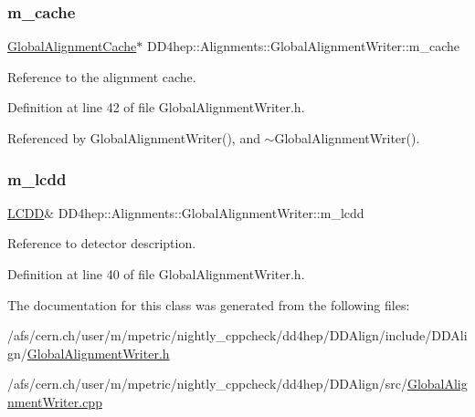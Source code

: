 \subsubsection{\texorpdfstring{m\+\_\+cache}{m\_cache}}
{\footnotesize\ttfamily \hyperlink{class_d_d4hep_1_1_alignments_1_1_global_alignment_cache}{Global\+Alignment\+Cache}$\ast$ D\+D4hep\+::\+Alignments\+::\+Global\+Alignment\+Writer\+::m\+\_\+cache\hspace{0.3cm}{\ttfamily [protected]}}



Reference to the alignment cache. 



Definition at line 42 of file Global\+Alignment\+Writer.\+h.



Referenced by Global\+Alignment\+Writer(), and $\sim$\+Global\+Alignment\+Writer().

\hypertarget{class_d_d4hep_1_1_alignments_1_1_global_alignment_writer_a831748e7145b8b3b95da4e0b87a49f5f}{}\label{class_d_d4hep_1_1_alignments_1_1_global_alignment_writer_a831748e7145b8b3b95da4e0b87a49f5f} 
\subsubsection{\texorpdfstring{m\+\_\+lcdd}{m\_lcdd}}
{\footnotesize\ttfamily \hyperlink{class_d_d4hep_1_1_geometry_1_1_l_c_d_d}{L\+C\+DD}\& D\+D4hep\+::\+Alignments\+::\+Global\+Alignment\+Writer\+::m\+\_\+lcdd\hspace{0.3cm}{\ttfamily [protected]}}



Reference to detector description. 



Definition at line 40 of file Global\+Alignment\+Writer.\+h.



The documentation for this class was generated from the following files\+:\begin{DoxyCompactItemize}
\item 
/afs/cern.\+ch/user/m/mpetric/nightly\+\_\+cppcheck/dd4hep/\+D\+D\+Align/include/\+D\+D\+Align/\hyperlink{_global_alignment_writer_8h}{Global\+Alignment\+Writer.\+h}\item 
/afs/cern.\+ch/user/m/mpetric/nightly\+\_\+cppcheck/dd4hep/\+D\+D\+Align/src/\hyperlink{_global_alignment_writer_8cpp}{Global\+Alignment\+Writer.\+cpp}\end{DoxyCompactItemize}
